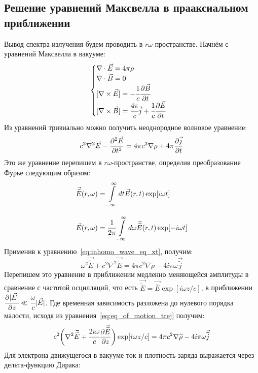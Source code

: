 \subsection{Решение уравнений Максвелла в прааксиальном приближении}
Вывод спектра излучения будем проводить в $r\omega$-пространстве. Начнём с уравнений Максвелла в вакууме:
\begin{equation}
	\begin{cases}
		\nabla \cdot \vec{E} = 4\pi \rho\\
		\nabla \cdot \vec{B} = 0\\
		[\nabla \times \vec{E}] = -\cfrac{1}{c} \cfrac{\partial\vec{B}}{\partial t}\\
		[\nabla \times \vec{B}] = \cfrac{4\pi}{c} \vec{j} + \cfrac{1}{c} \cfrac{\partial\vec{E}}{\partial t}
	\end{cases} 
\end{equation}
Из уравнений тривиально можно получить неоднородное волновое уравнение: 
\begin{equation}
	\label{eq:inhomo_wave_eq_xt}
	c^2 \nabla^2 \vec{E} - \pdv[2]{\vec{E}}{t} = 4\pi c^2 \nabla \rho + 4\pi \pdv{\vec{j}}{t}
\end{equation}
Это же уравнение перепишем в $r\omega$-пространстве, определив преобразование Фурье следующим образом:
\begin{equation}
	\label{eq:Fourier_wt}
	\begin{array}{lcl}
		\vec{\widetilde{E}}(r, \omega) = \displaystyle\int\limits_{-\infty}^{\infty} dt \vec{E}(r, t)\exp[i\omega t]\\
		\\
		\vec{E}(r, \omega) = \cfrac{1}{2\pi}\displaystyle\int\limits_{-\infty}^{\infty} d\omega \vec{\widetilde{E}}(r, t)\exp[-i\omega t]
	\end{array}
\end{equation}
Применив к уравнению~\ref{eq:inhomo_wave_eq_xt}, получим:
\begin{equation}
	\label{eq:inhomo_wave_eq_xw}
	\omega^2 \vec{\widetilde{E}} + c^2 \nabla^2 \vec{\widetilde{E}} = 4\pi c^2 \nabla  \widetilde{\rho} - 4i\pi\omega\vec{\widetilde{j}}
\end{equation}
Перепишем это уравнение в приближении медленно меняющейся амплитуды в сравнение с частотой осцилляций, что есть $\vec{\widetilde{E}} =  \vec{\overline{E}}\exp[i\omega z/c]$, в приближении $\cfrac{\partial |\vec{E}|}{\partial z} \ll \cfrac{\omega}{c}|\vec{E}|$. Где временная зависимость разложена до нулевого порядка малости, исходя из уравнения~\ref{eq:eq_of_motion_trej} получим:
\begin{equation}
	\label{eq:wave_slow_vary}
	c^2\bigg(\nabla^2 \vec{\widetilde{E}} + \cfrac{2i\omega}{c}\pdv{\vec{\widetilde{E}}}{z}\bigg)\exp[i\omega z/c] = 4\pi c^2 \nabla  \widetilde{\rho} - 4i\pi\omega\vec{\widetilde{j}}
\end{equation}
Для электрона движущегося в вакууме ток и плотность заряда выражается через дельта-функцию Дирака:


